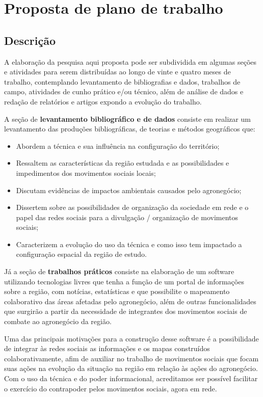 \chapter{Proposta de plano de trabalho}

\section{Descrição}

A elaboração da pesquisa aqui proposta pode ser subdividida em algumas seções e atividades para serem distribuídas ao longo de vinte e quatro meses de trabalho, contemplando levantamento de bibliografias e dados, trabalhos de campo, atividades de cunho prático e/ou técnico, além de análise de dados e redação de relatórios e artigos expondo a evolução do trabalho.

A seção de \textbf{levantamento bibliográfico e de dados} consiste em realizar um levantamento das produções bibliográficas, de teorias e métodos geográficos que:

\begin{itemize}
 \item Abordem a técnica e sua influência na configuração do território;
 \item Ressaltem as características da região estudada e as possibilidades e impedimentos dos movimentos sociais locais;
 \item Discutam evidências de impactos ambientais causados pelo agronegócio;
 \item Dissertem sobre as possibilidades de organização da sociedade em rede e o papel das redes sociais para a divulgação / organização de movimentos sociais;
 \item Caracterizem a evolução do uso da técnica e como isso tem impactado a configuração espacial da região de estudo.
\end{itemize}

Já a seção de \textbf{trabalhos práticos} consiste na elaboração de um software utilizando tecnologias livres que tenha a função de um portal de informações sobre a região, com notícias, estatísticas e que possibilite o mapeamento colaborativo das áreas afetadas pelo agronegócio, além de outras funcionalidades que surgirão a partir da necessidade de integrantes dos movimentos sociais de combate ao agronegócio da região.

Uma das principais motivações para a construção desse software é a possibilidade de integrar às redes sociais as informações e os mapas construídos colaborativamente, afim de auxiliar no trabalho de movimentos sociais que focam suas ações na evolução da situação na região em relação às ações do agronegócio. Com o uso da técnica e do poder informacional, acreditamos ser possível facilitar o exercício do contrapoder pelos movimentos sociais, agora em rede.

